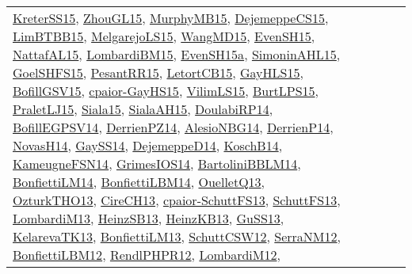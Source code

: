 {\begin{longtable}{lp{3cm}>{\raggedright}p{6cm}>{\raggedright}p{6cm}p{8cm}}
\href{papers/KreterSS15.pdf}{KreterSS15}\cite{KreterSS15}, \href{papers/ZhouGL15.pdf}{ZhouGL15}\cite{ZhouGL15}, \href{papers/MurphyMB15.pdf}{MurphyMB15}\cite{MurphyMB15}, \href{papers/DejemeppeCS15.pdf}{DejemeppeCS15}\cite{DejemeppeCS15}, \href{papers/LimBTBB15.pdf}{LimBTBB15}\cite{LimBTBB15}, \href{papers/MelgarejoLS15.pdf}{MelgarejoLS15}\cite{MelgarejoLS15}, \href{articles/WangMD15.pdf}{WangMD15}\cite{WangMD15}, \href{papers/EvenSH15.pdf}{EvenSH15}\cite{EvenSH15}, \href{articles/NattafAL15.pdf}{NattafAL15}\cite{NattafAL15}, \href{papers/LombardiBM15.pdf}{LombardiBM15}\cite{LombardiBM15}, \href{articles/EvenSH15a.pdf}{EvenSH15a}\cite{EvenSH15a}, \href{articles/SimoninAHL15.pdf}{SimoninAHL15}\cite{SimoninAHL15}, \href{articles/GoelSHFS15.pdf}{GoelSHFS15}\cite{GoelSHFS15}, \href{papers/PesantRR15.pdf}{PesantRR15}\cite{PesantRR15}, \href{articles/LetortCB15.pdf}{LetortCB15}\cite{LetortCB15}, \href{papers/GayHLS15.pdf}{GayHLS15}\cite{GayHLS15}, \href{papers/BofillGSV15.pdf}{BofillGSV15}\cite{BofillGSV15}, \href{papers/cpaior-GayHS15.pdf}{cpaior-GayHS15}\cite{cpaior-GayHS15}, \href{papers/VilimLS15.pdf}{VilimLS15}\cite{VilimLS15}, \href{papers/BurtLPS15.pdf}{BurtLPS15}\cite{BurtLPS15}, \href{papers/PraletLJ15.pdf}{PraletLJ15}\cite{PraletLJ15}, \href{articles/Siala15.pdf}{Siala15}\cite{Siala15}, \href{papers/SialaAH15.pdf}{SialaAH15}\cite{SialaAH15}, \href{papers/DoulabiRP14.pdf}{DoulabiRP14}\cite{DoulabiRP14}, \href{papers/BofillEGPSV14.pdf}{BofillEGPSV14}\cite{BofillEGPSV14}, \href{papers/DerrienPZ14.pdf}{DerrienPZ14}\cite{DerrienPZ14}, \href{papers/AlesioNBG14.pdf}{AlesioNBG14}\cite{AlesioNBG14}, \href{papers/DerrienP14.pdf}{DerrienP14}\cite{DerrienP14}, \href{articles/NovasH14.pdf}{NovasH14}\cite{NovasH14}, \href{papers/GaySS14.pdf}{GaySS14}\cite{GaySS14}, \href{papers/DejemeppeD14.pdf}{DejemeppeD14}\cite{DejemeppeD14}, \href{papers/KoschB14.pdf}{KoschB14}\cite{KoschB14}, \href{articles/KameugneFSN14.pdf}{KameugneFSN14}\cite{KameugneFSN14}, \href{articles/GrimesIOS14.pdf}{GrimesIOS14}\cite{GrimesIOS14}, \href{papers/BartoliniBBLM14.pdf}{BartoliniBBLM14}\cite{BartoliniBBLM14}, \href{papers/BonfiettiLM14.pdf}{BonfiettiLM14}\cite{BonfiettiLM14}, \href{articles/BonfiettiLBM14.pdf}{BonfiettiLBM14}\cite{BonfiettiLBM14}, \href{papers/OuelletQ13.pdf}{OuelletQ13}\cite{OuelletQ13}, \href{articles/OzturkTHO13.pdf}{OzturkTHO13}\cite{OzturkTHO13}, \href{papers/CireCH13.pdf}{CireCH13}\cite{CireCH13}, \href{papers/cpaior-SchuttFS13.pdf}{cpaior-SchuttFS13}\cite{cpaior-SchuttFS13}, \href{papers/SchuttFS13.pdf}{SchuttFS13}\cite{SchuttFS13}, \href{papers/LombardiM13.pdf}{LombardiM13}\cite{LombardiM13}, \href{articles/HeinzSB13.pdf}{HeinzSB13}\cite{HeinzSB13}, \href{papers/HeinzKB13.pdf}{HeinzKB13}\cite{HeinzKB13}, \href{papers/GuSS13.pdf}{GuSS13}\cite{GuSS13}, \href{papers/KelarevaTK13.pdf}{KelarevaTK13}\cite{KelarevaTK13}, \href{papers/BonfiettiLM13.pdf}{BonfiettiLM13}\cite{BonfiettiLM13}, \href{papers/SchuttCSW12.pdf}{SchuttCSW12}\cite{SchuttCSW12}, \href{papers/SerraNM12.pdf}{SerraNM12}\cite{SerraNM12}, \href{papers/BonfiettiLBM12.pdf}{BonfiettiLBM12}\cite{BonfiettiLBM12}, \href{papers/RendlPHPR12.pdf}{RendlPHPR12}\cite{RendlPHPR12}, \href{articles/LombardiM12.pdf}{LombardiM12}\cite{LombardiM12}, 
\end{longtable}}

